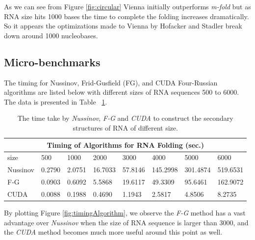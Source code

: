 \documentclass[12pt]{article}
\begin{document}
As we can see from Figure \ref{fig:circular} Vienna initially outperforms \textit{m-fold} but as RNA size hits 1000 bases the time to
complete the folding increases dramatically. So it appears the optimizations made to Vienna by Hofacker and
Stadler\cite{circular} break down around 1000 nucleobases.

\subsection{Micro-benchmarks}
The timing for Nussinov, Frid-Gusfield (FG), and CUDA Four-Russian algorithms are listed below with different sizes of RNA sequences 500 to 6000. The data is presented in Table ~\ref{table:timingAlgorithm}.\\
\begin{table}[H]
\begin{center}
    \begin{tabular}{ |p{1.5cm}||p{1.2cm}|p{1.3cm}|p{1.3cm}|p{1.4cm}|p{1.4cm}|p{1.4cm}|p{1.6cm}|}
     \hline
     \multicolumn{8}{|c|}{Timing of Algorithms for RNA Folding (sec.)} \\
     \hline
     size& 500& 1000& 2000& 3000& 4000& 5000& 6000\\
     \hline
     Nussinov& 0.2790& 2.0751& 16.7033& 57.8146& 145.2998& 301.4874& 519.6531\\
     F-G& 0.0903& 0.6092& 5.5868& 19.6117& 49.3309& 95.6461& 162.9072\\
     CUDA& 0.0088& 0.1988& 0.4690& 1.1943& 2.5817& 4.8506& 8.2735\\
     \hline
    \end{tabular}
\end{center}
\caption{The time take by \textit{Nussinov}, \textit{F-G} and \textit{CUDA} to construct the secondary structures of RNA of different size.}
\label{table:timingAlgorithm}
\end{table}
\par By plotting Figure \ref{fig:timingAlgorithm}, we observe the \textit{F-G} method has a vast advantage
over \textit{Nussinov} when the size of RNA sequence is larger than 3000, and the \textit{CUDA} method
becomes much more useful around this point as well.
\end{document}

